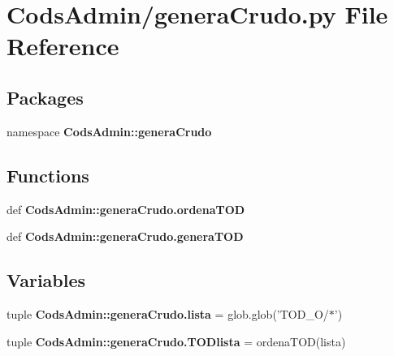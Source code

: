 \section{\-Cods\-Admin/genera\-Crudo.py \-File \-Reference}
\label{genera_crudo_8py}
\subsection*{\-Packages}
\begin{DoxyCompactItemize}
\item 
namespace {\bf \-Cods\-Admin\-::genera\-Crudo}
\end{DoxyCompactItemize}
\subsection*{\-Functions}
\begin{DoxyCompactItemize}
\item 
def {\bf \-Cods\-Admin\-::genera\-Crudo.\-ordena\-T\-O\-D}
\item 
def {\bf \-Cods\-Admin\-::genera\-Crudo.\-genera\-T\-O\-D}
\end{DoxyCompactItemize}
\subsection*{\-Variables}
\begin{DoxyCompactItemize}
\item 
tuple {\bf \-Cods\-Admin\-::genera\-Crudo.\-lista} = glob.\-glob('\-T\-O\-D\-\_\-\-O/$\ast$')
\item 
tuple {\bf \-Cods\-Admin\-::genera\-Crudo.\-T\-O\-Dlista} = ordena\-T\-O\-D(lista)
\end{DoxyCompactItemize}
